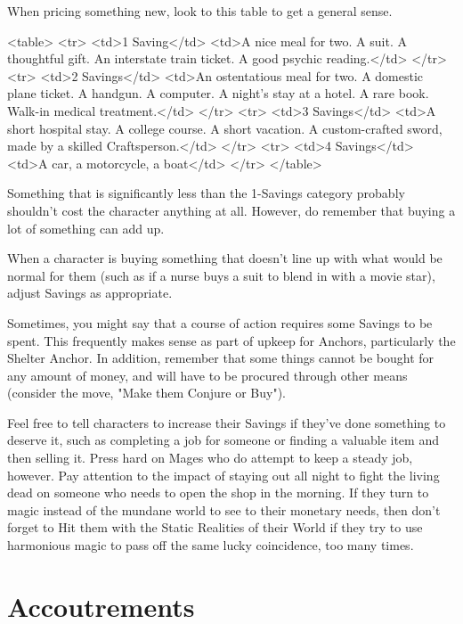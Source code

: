 \documentclass[
  oneside,
  statementpaper,
  9pt]{memoir}
\begin{document}
\begin{MC}

When pricing something new, look to this table to get a general sense.

<table>
  <tr>
    <td>1 Saving</td>
    <td>A nice meal for two. A suit. A thoughtful gift. An interstate train ticket. A good psychic reading.</td>
  </tr>
  <tr>
    <td>2 Savings</td>
    <td>An ostentatious meal for two. A domestic plane ticket. A handgun. A computer. A night’s stay at a hotel. A rare book. Walk-in medical treatment.</td>
  </tr>
  <tr>
    <td>3 Savings</td>
    <td>A short hospital stay. A college course. A short vacation. A custom-crafted sword, made by a skilled Craftsperson.</td>
  </tr>
  <tr>
    <td>4 Savings</td>
    <td>A car, a motorcycle, a boat</td>
  </tr>
</table>

Something that is significantly less than the 1-Savings category probably shouldn’t cost the character anything at all. However, do remember that buying a lot of something can add up.

When a character is buying something that doesn’t line up with what would be normal for them (such as if a nurse buys a suit to blend in with a movie star), adjust Savings as appropriate.

Sometimes, you might say that a course of action requires some Savings to be spent. This frequently makes sense as part of upkeep for Anchors, particularly the Shelter Anchor. In addition, remember that some things cannot be bought for any amount of money, and will have to be procured through other means (consider the move, "Make them Conjure or Buy").

Feel free to tell characters to increase their Savings if they've done something to deserve it, such as completing a job for someone or finding a valuable item and then selling it. Press hard on Mages who do attempt to keep a steady job, however. Pay attention to the impact of staying out all night to fight the living dead on someone who needs to open the shop in the morning. If they turn to magic instead of the mundane world to see to their monetary needs, then don't forget to Hit them with the Static Realities of their World if they try to use harmonious magic to pass off the same lucky coincidence, too many times. 

\end{MC}

\hypertarget{accoutrements}{%
\section{Accoutrements}\label{accoutrements}}
\end{document}
